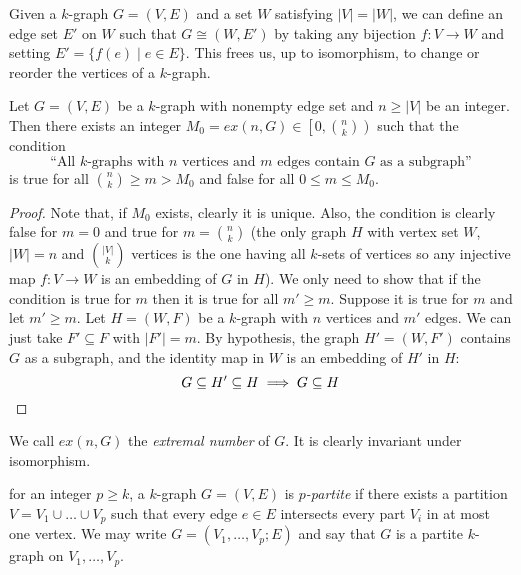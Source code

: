 \begin{remark} \label{rem:change_vertices}
    Given a $k$-graph $G = (V, E)$ and a set $W$ satisfying $|V| = |W|$,
    we can define an edge set $E'$ on $W$ such that $G \cong (W, E')$
    by taking any bijection $f: V \to W$ and setting $E' = \{f(e) \mid e \in E\}$.
    This frees us, up to isomorphism, to change or reorder
    the vertices of a $k$-graph.
\end{remark}

\begin{proposition} \label{prop:extremal}
    Let $G = (V, E)$ be a $k$-graph with nonempty edge set and $n \geq |V|$ be an integer.
    Then there exists an integer $M_0 = ex(n, G) \in \left[ 0, \binom{n}{k}\right)$ such that
    the condition
    \[
        \text{``All $k$-graphs with $n$ vertices and $m$ edges contain $G$ as a subgraph''}
    \]
    is true for all $\binom{n}{k} \geq m > M_0$ and false for all $0 \leq m \leq M_0$.

    \begin{proof}
        Note that, if $M_0$ exists, clearly it is unique.
        Also, the condition is clearly false for $m = 0$ and
        true for $m = \binom{n}{k}$
        (the only graph $H$ with vertex set $W$, $|W|=n$ and $\binom{|V|}{k}$ vertices
        is the one having all $k$-sets of vertices so any injective map $f: V \to W$
        is an embedding of $G$ in $H$).
        We only need to show that if the condition is true for $m$ then it is true for
        all $m' \geq m$.
        Suppose it is true for $m$ and let $m' \geq m$.
        Let $H = (W, F)$ be a $k$-graph with $n$ vertices and $m'$ edges.
        We can just take $F' \subseteq F$ with $|F'| = m$.
        By hypothesis, the graph $H' = (W, F')$ contains $G$ as a subgraph,
        and the identity map in $W$ is an embedding of $H'$ in $H$:
        \[
            G \subseteq H' \subseteq H \implies G \subseteq H \qedhere
        \]
    \end{proof}

\end{proposition}

\begin{remark}
    We call $ex(n, G)$ the \emph{extremal number} of $G$.
    It is clearly invariant under isomorphism.
\end{remark}

\begin{definition}
    for an integer $p \geq k$, a $k$-graph $G = (V, E)$ is \emph{$p$-partite}
    if there exists a partition $V = V_1 \cup \dots \cup V_p$
    such that every edge $e \in E$ intersects every part $V_i$ in at most one vertex.
    We may write $G = (V_1, \dots, V_p; E)$ and say that
    $G$ is a partite $k$-graph on $V_1, \dots, V_p$.
\end{definition}

